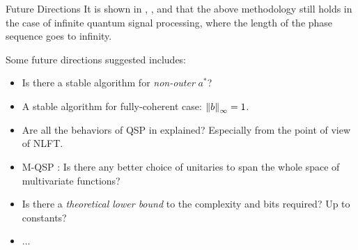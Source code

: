     

\begin{frame}{Future Directions}
    It is shown in \cite{Szego}, \cite{GQSP_NLFT}, and \cite{Lin2025} that the above methodology still holds in the case of infinite quantum signal processing, where the length of the phase sequence goes to infinity.
    
    Some future directions suggested includes:
    \begin{itemize}
        \item Is there a stable algorithm for \textit{non-outer} $a^*$?
        \item A stable algorithm for fully-coherent case: $\left\lVert{b}\right\rVert_\infty=1$.
        \item Are all the behaviors of QSP in \cite{EnergyLandscpae} explained? Especially from the point of view of NLFT.
        \item M-QSP \cite{MQSP}: Is there any better choice of unitaries to span the whole space of multivariate functions?
        \item Is there a \textit{theoretical lower bound} to the complexity and bits required? Up to constants?
        \item ...
    \end{itemize}
\end{frame}